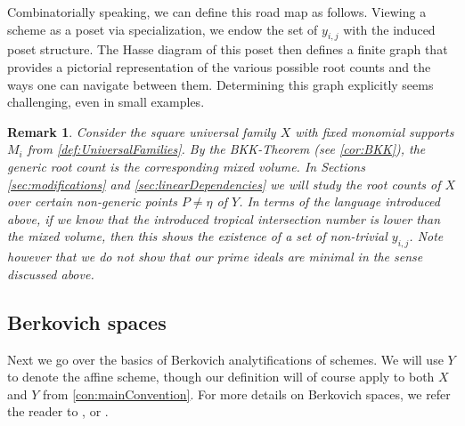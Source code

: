 \documentclass[12pt,reqno,a4paper]{amsart}
\theoremstyle{theoremstyle}
\theoremstyle{examplestyle}
\newtheorem{remark}[theorem]{Remark}
\theoremstyle{algorithmstyle}
\begin{document}
%
%

Combinatorially speaking, we can define this road map as follows. Viewing a scheme as a poset via specialization, we endow the set of $y_{i,j}$
  with the induced poset structure. The Hasse diagram of this poset then defines a finite graph that provides a pictorial representation of the various possible root counts and the ways one can navigate between them. Determining this graph explicitly seems challenging, even in small examples.


\begin{remark}
%
  Consider the square universal family $X$ with fixed monomial supports $M_{i}$ from \cref{def:UniversalFamilies}. By the BKK-Theorem (see \cref{cor:BKK}), the generic root count is the corresponding mixed volume. In Sections \ref{sec:modifications} and \ref{sec:linearDependencies} we will study the root counts of $X$ over certain non-generic points $P\neq\eta$ of $Y$. In terms of the language introduced above, if we know that the introduced tropical intersection number is lower than the mixed volume, then this shows the existence of a set of non-trivial $y_{i,j}$. Note however that we do not show that our prime ideals are minimal in the sense discussed above.   %
\end{remark}


\subsection{Berkovich spaces}\label{sec:BerkovichSpaces}
Next we go over the basics of Berkovich analytifications of schemes.  We will use $Y$ to denote the affine scheme, though our definition will of course apply to both $X$ and $Y$ from \cref{con:mainConvention}.  For more details on Berkovich spaces, we refer the reader to \cite{Gubler2013}, \cite{Temkin15} or \cite{BPR2016}.
\end{document}
